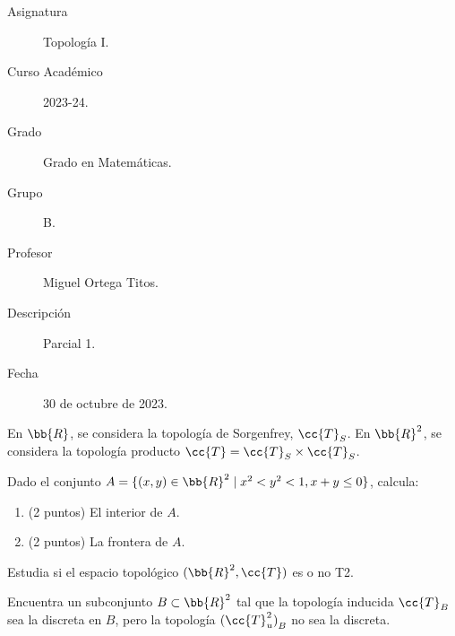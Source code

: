 \documentclass[12pt]{article}
\newcommand{\T}[0]{\cc{T}}
\begin{document}

    
    

    \begin{description}
        \item[Asignatura] Topología I.
        \item[Curso Académico] 2023-24.
        \item[Grado] Grado en Matemáticas.
        \item[Grupo] B.
        \item[Profesor] Miguel Ortega Titos.
        \item[Descripción] Parcial 1.
        \item[Fecha] 30 de octubre de 2023.
    
    \end{description}
    \newpage
    
    En $\bb{R}$, se considera la topología de Sorgenfrey, $\T_S$. En $\bb{R}^2$, se considera la topología producto $\T=\T_S\times \T_S$.
    \begin{ejercicio}
        Dado el conjunto $A=\{(x,y)\in \bb{R}^2\mid x^2<y^2<1, x+y\leq 0\}$, calcula:
        \begin{enumerate}
            \item (2 puntos) El interior de $A$.            

            \item (2 puntos) La frontera de $A$.
        \end{enumerate}
    \end{ejercicio}

    \begin{ejercicio}[1 punto]
        Estudia si el espacio topológico $(\bb{R}^2,\T)$ es o no T2.
    \end{ejercicio}

    \begin{ejercicio}[1.5 puntos]
        Encuentra un subconjunto $B\subset \bb{R}^2$ tal que la topología inducida $\T_{B}$ sea la discreta en $B$, pero la topología ${(\T_u^2)}_B$ no sea la discreta.
    \end{ejercicio}
\end{document}
